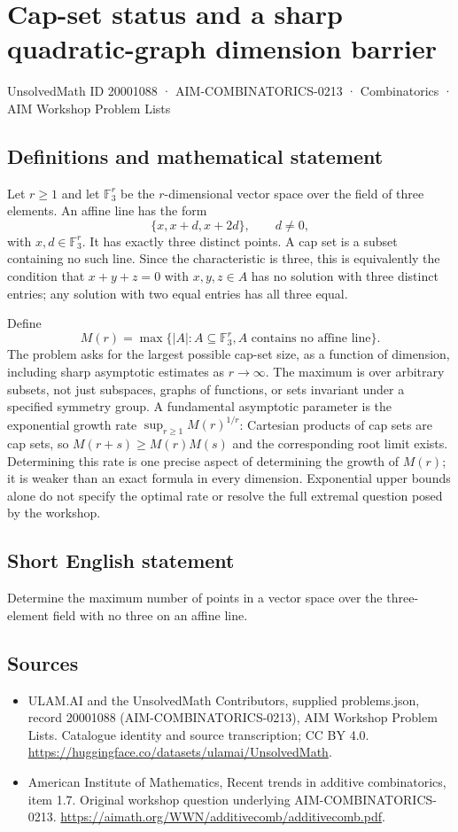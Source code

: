 \documentclass[11pt,a4paper]{article}
\begin{document}
\section*{Cap-set status and a sharp quadratic-graph dimension barrier}\label{20001088}
{\small UnsolvedMath ID 20001088 · AIM-COMBINATORICS-0213 · Combinatorics · AIM Workshop Problem Lists}
\subsection{Definitions and mathematical statement}
Let $r\ge1$ and let $\mathbb F_3^r$ be the $r$-dimensional vector
space over the field of three elements. An affine line has the form
\[
                         \{x,x+d,x+2d\},\qquad d\ne0,
\]
with $x,d\in\mathbb F_3^r$. It has exactly three distinct points.
A cap set is a subset containing no such line. Since the
characteristic is three, this is equivalently the condition that
$x+y+z=0$ with $x,y,z\in A$ has no solution with three distinct
entries; any solution with two equal entries has all three equal.

Define
\[
 M(r)=\max\{|A|:A\subseteq\mathbb F_3^r,
                               A\text{ contains no affine line}\}.
\]
The problem asks for the largest possible cap-set size, as a function
of dimension, including sharp asymptotic estimates as $r\to\infty$.
The maximum is over arbitrary subsets, not just subspaces, graphs
of functions, or sets invariant under a specified symmetry group.
A fundamental asymptotic parameter is the exponential growth rate
$\sup_{r\ge1}M(r)^{1/r}$: Cartesian products of cap sets are cap
sets, so $M(r+s)\ge M(r)M(s)$ and the corresponding root limit
exists. Determining this rate is one precise aspect of determining
the growth of $M(r)$; it is weaker than an exact formula in every
dimension. Exponential upper bounds alone do not specify the optimal
rate or resolve the full extremal question posed by the workshop.
\subsection{Short English statement}
Determine the maximum number of points in a vector space over the three-element field with no three on an affine line.
\subsection{Sources}
\begin{itemize}
\item[S1] ULAM.AI and the UnsolvedMath Contributors, supplied problems.json, record 20001088 (AIM-COMBINATORICS-0213), AIM Workshop Problem Lists. Catalogue identity and source transcription; CC BY 4.0.
\url{https://huggingface.co/datasets/ulamai/UnsolvedMath}.
\item[S2] American Institute of Mathematics, Recent trends in additive combinatorics, item 1.7. Original workshop question underlying AIM-COMBINATORICS-0213.
\url{https://aimath.org/WWN/additivecomb/additivecomb.pdf}.
\end{itemize}
\end{document}

